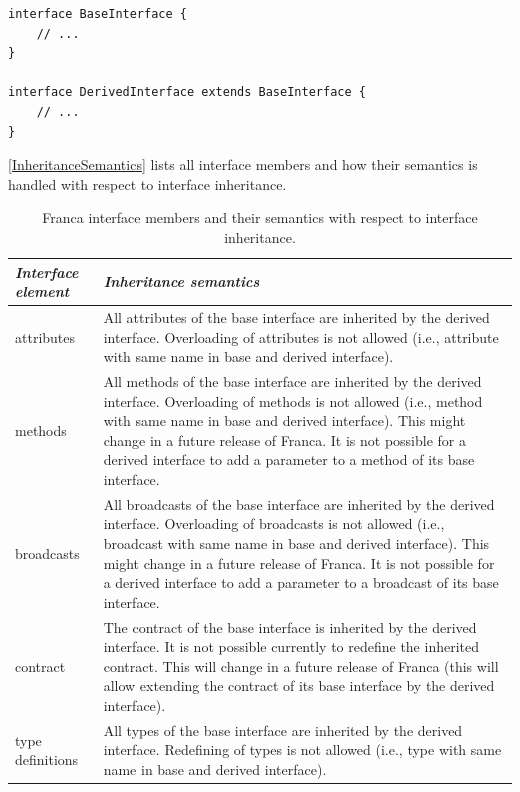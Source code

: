 \documentclass[a4paper,10pt]{scrreprt}
\newlength{\XdocTEffectiveWidth}
\begin{document}
\begin{lstlisting}[language=Franca]
interface BaseInterface {
	// ...
}

interface DerivedInterface extends BaseInterface {
	// ...
}
\end{lstlisting}

\autoref{InheritanceSemantics} lists all interface members and
how their semantics is handled with respect to interface inheritance.


\begin{table}
\setlength{\XdocTEffectiveWidth}{\textwidth}
\addtolength{\XdocTEffectiveWidth}{-4.0\tabcolsep}
\noindent\begin{tabular}{p{0.20\XdocTEffectiveWidth}p{0.80\XdocTEffectiveWidth}}
\toprule
\textit{Interface element}

 & \textit{Inheritance semantics}

\\
\midrule
attributes

 & All attributes of the base interface are inherited by the derived interface.
		   Overloading of attributes is not allowed (i.e., attribute with same name in 
		   base and derived interface).

\\
methods

 & All methods of the base interface are inherited by the derived interface.
		   Overloading of methods is not allowed (i.e., method with same name in 
		   base and derived interface). This might change in a future release of Franca.
		   It is not possible for a derived interface to add a parameter to a method
		   of its base interface. 

\\
broadcasts

 & All broadcasts of the base interface are inherited by the derived interface.
		   Overloading of broadcasts is not allowed (i.e., broadcast with same name in 
		   base and derived interface). This might change in a future release of Franca.
		   It is not possible for a derived interface to add a parameter to a broadcast
		   of its base interface. 

\\
contract

 & The contract of the base interface is inherited by the derived interface.
		   It is not possible currently to redefine the inherited contract.
		   This will change in a future release of Franca (this will allow extending
		   the contract of its base interface by the derived interface).

\\
type definitions

 & All types of the base interface are inherited by the derived interface.
		   Redefining of types is not allowed (i.e., type with same name in 
		   base and derived interface).

\\
\bottomrule
\end{tabular}
\caption{Franca interface members and their semantics with respect to interface inheritance.}
\label{InheritanceSemantics}
\end{table}
\end{document}
